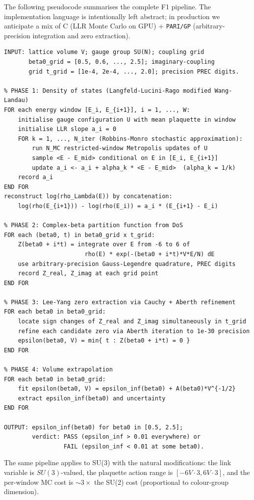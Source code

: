 \documentclass[11pt,a4paper]{article}
\theoremstyle{definition}
\theoremstyle{remark}
\begin{document}
The following pseudocode summarises the complete F1 pipeline. The
implementation language is intentionally left abstract; in
production we anticipate a mix of C (LLR Monte Carlo on GPU) +
\texttt{PARI/GP} (arbitrary-precision integration and zero
extraction).

\begin{verbatim}
INPUT: lattice volume V; gauge group SU(N); coupling grid
       beta0_grid = [0.5, 0.6, ..., 2.5]; imaginary-coupling
       grid t_grid = [1e-4, 2e-4, ..., 2.0]; precision PREC digits.

% PHASE 1: Density of states (Langfeld-Lucini-Rago modified Wang-Landau)
FOR each energy window [E_i, E_{i+1}], i = 1, ..., W:
    initialise gauge configuration U with mean plaquette in window
    initialise LLR slope a_i = 0
    FOR k = 1, ..., N_iter (Robbins-Monro stochastic approximation):
        run N_MC restricted-window Metropolis updates of U
        sample <E - E_mid> conditional on E in [E_i, E_{i+1}]
        update a_i <- a_i + alpha_k * <E - E_mid>  (alpha_k = 1/k)
    record a_i
END FOR
reconstruct log(rho_Lambda(E)) by concatenation:
    log(rho(E_{i+1})) - log(rho(E_i)) = a_i * (E_{i+1} - E_i)

% PHASE 2: Complex-beta partition function from DoS
FOR each (beta0, t) in beta0_grid x t_grid:
    Z(beta0 + i*t) = integrate over E from -6 to 6 of
                       rho(E) * exp(-(beta0 + i*t)*V*E/N) dE
    use arbitrary-precision Gauss-Legendre quadrature, PREC digits
    record Z_real, Z_imag at each grid point
END FOR

% PHASE 3: Lee-Yang zero extraction via Cauchy + Aberth refinement
FOR each beta0 in beta0_grid:
    locate sign changes of Z_real and Z_imag simultaneously in t_grid
    refine each candidate zero via Aberth iteration to 1e-30 precision
    epsilon(beta0, V) = min{ t : Z(beta0 + i*t) = 0 }
END FOR

% PHASE 4: Volume extrapolation
FOR each beta0 in beta0_grid:
    fit epsilon(beta0, V) = epsilon_inf(beta0) + A(beta0)*V^{-1/2}
    extract epsilon_inf(beta0) and uncertainty
END FOR

OUTPUT: epsilon_inf(beta0) for beta0 in [0.5, 2.5];
        verdict: PASS (epsilon_inf > 0.01 everywhere) or
                 FAIL (epsilon_inf < 0.01 at some beta0).
\end{verbatim}

The same pipeline applies to SU(3) with the natural modifications:
the link variable is $SU(3)$-valued, the plaquette action range is
$[-6V \cdot 3, 6V \cdot 3]$, and the per-window MC cost is
$\sim 3 \times$ the SU(2) cost (proportional to colour-group
dimension).
\end{document}
